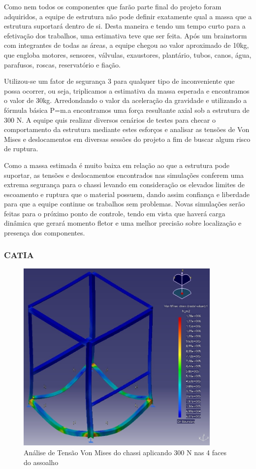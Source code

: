 Como nem todos os componentes que farão parte final do projeto foram adquiridos, a equipe de estrutura não pode definir exatamente qual a massa que a estrutura suportará dentro de si. Desta maneira e tendo um tempo curto para a efetivação dos trabalhos, uma estimativa teve que ser feita. Após um brainstorm com integrantes de todas as áreas, a equipe chegou ao valor aproximado de 10kg, que engloba motores, sensores, válvulas, exaustores, plantário, tubos, canos, água, parafusos, roscas, reservatório e fiação.

Utilizou-se um fator de segurança 3 para qualquer tipo de inconveniente que possa ocorrer, ou seja, triplicamos a estimativa da massa esperada e encontramos o valor de 30kg. Arredondando o valor da aceleração da gravidade e utilizando a fórmula básica P=m.a encontramos uma força resultante axial sob a estrutura de 300 N. A equipe quis realizar diversos cenários de testes para checar o comportamento da estrutura mediante estes esforços e analisar as tensões de Von Mises e deslocamentos em diversas sessões do projeto a fim de buscar algum risco de ruptura. 

Como a massa estimada é muito baixa em relação ao que a estrutura pode suportar, as tensões e deslocamentos encontrados nas simulações conferem uma extrema segurança para o chassi levando em consideração os elevados limites de escoamento e ruptura que o material possuem, dando assim confiança e liberdade para que a equipe continue os trabalhos sem problemas.
Novas simulações serão feitas para o próximo ponto de controle, tendo em vista que haverá carga dinâmica que gerará momento fletor e uma melhor precisão sobre localização e presença dos componentes.

\subsubsection{CATIA}

\begin{figure}[H]
	\centering
	\includegraphics[width=10cm]{figuras/catia_1.jpg}
	\caption{Análise de Tensão Von Mises do chassi aplicando 300 N nas 4 faces do assoalho} 
	\label{catia_1}
\end{figure}

